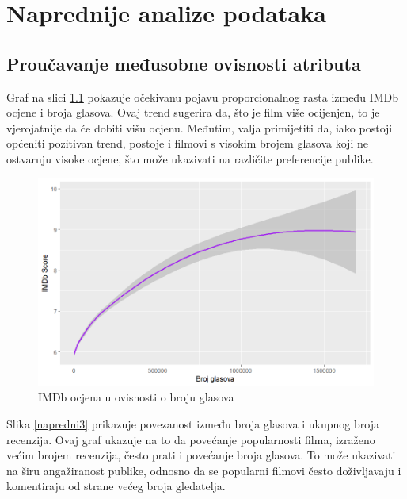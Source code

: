 \chapter{Naprednije analize podataka}

	\section{Proučavanje međusobne ovisnosti atributa}
	
	Graf na slici \ref{napredni1} pokazuje očekivanu pojavu proporcionalnog rasta između IMDb ocjene i broja glasova. Ovaj trend sugerira da, što je film više ocijenjen, to je vjerojatnije da će dobiti višu ocjenu. Međutim, valja primijetiti da, iako postoji općeniti pozitivan trend, postoje i filmovi s visokim brojem glasova koji ne ostvaruju visoke ocjene, što može ukazivati na različite preferencije publike.
	
	\begin{figure}[H]
		\centering
		\includegraphics[width=15cm]{../figures/lucija_slozeni/glasoviocjena.png}
		\caption{IMDb ocjena u ovisnosti o broju glasova}
		\label{napredni1}
	\end{figure}
	
	Slika \ref{napredni3} prikazuje povezanost između broja glasova i ukupnog broja recenzija. Ovaj graf ukazuje na to da povećanje popularnosti filma, izraženo većim brojem recenzija, često prati i povećanje broja glasova. To može ukazivati na širu angažiranost publike, odnosno da se popularni filmovi često doživljavaju i komentiraju od strane većeg broja gledatelja.
	

